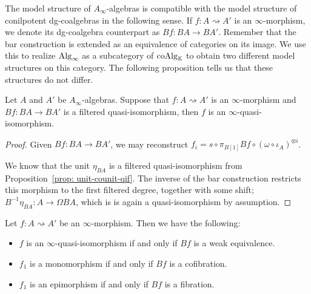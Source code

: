 \documentclass[../thesis.tex]{subfiles}
\begin{document}
        The model structure of $A_\infty$-algebras is compatible with the model structure of conilpotent dg-coalgebras in the following sense. If $f: A \rightsquigarrow A'$ is an $\infty$-morphism, we denote its dg-coalgebra counterpart as $Bf: BA \rightarrow BA'$. Remember that the bar construction is extended as an equivalence of categories on its image. We use this to realize $\tt{Alg}_\infty$ as a subcategory of $\tt{coAlg}_\mathbb{K}$ to obtain two different model structures on this category. The following proposition tells us that these structures do not differ.

        \begin{lemma}\label{lem: qif-infty-qi}
            Let $A$ and $A'$ be $A_\infty$-algebras. Suppose that $f: A \rightsquigarrow A'$ is an $\infty$-morphism and $Bf: BA \rightarrow BA'$ is a filtered quasi-isomorphism, then $f$ is an $\infty$-quasi-isomorphism. 
        \end{lemma}

        \begin{proof}
            Given $Bf : BA \rightarrow BA'$, we may reconstruct $f_i = s \circ \pi_{B[1]} Bf \circ (\omega \circ \iota_A)^{\otimes i}$.

            We know that the unit $\eta_{BA}$ is a filtered quasi-isomorphism from Proposition~\ref{prop: unit-counit-qif}. The inverse of the bar construction restricts this morphism to the first filtered degree, together with some shift; $B^{-1}\eta_{BA}: A \rightarrow \Omega BA$, which is is again a quasi-isomorphism by assumption.
        \end{proof}

        \begin{proposition}\label{prop: coherent-model-structure}
            Let $f : A \rightsquigarrow A'$ be an $\infty$-morphism. Then we have the following:
            \begin{itemize}
                \item $f$ is an $\infty$-quasi-isomorphism if and only if $Bf$ is a weak equivalence.
                \item $f_1$ is a monomorphism if and only if $Bf$ is a cofibration.
                \item $f_1$ is an epimorphism if and only if $Bf$ is a fibration.
            \end{itemize}
        \end{proposition}
\end{document}
